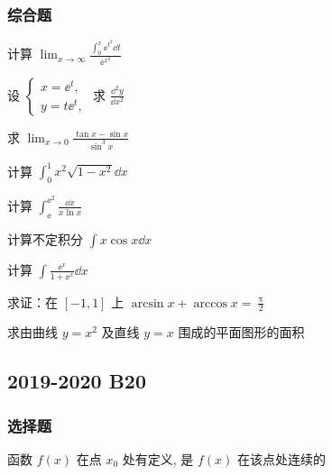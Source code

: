 \subsubsection{综合题}
\begin{ti}
	计算 $\lim_{x \to \infty} \frac{\int_{0}^{x} \ee^{t^{2}} \dd{t}}{\ee^{x^{2}}}$
\end{ti}

\begin{ti}
	设 $\begin{cases}
		x = \ee^{t},\\
		y = t \ee^{t},
	\end{cases}$ 求 $\frac{\dd^{2}y}{\dd{x^{2}}}$
\end{ti}

\begin{ti}
	求 $\lim_{x \to 0} \frac{\tan x - \sin x}{\sin^{3}x}$
\end{ti}

\begin{ti}
	计算 $\int_{0}^{1} x^{2} \sqrt{1 - x^{2}} \dd{x}$
\end{ti}

\begin{ti}
	计算 $\int_{\ee}^{\ee^{2}} \frac{\dd{x}}{x \ln x}$
\end{ti}

\begin{ti}
	计算不定积分 $\int x \cos x \dd{x}$
\end{ti}

\begin{ti}
	计算 $\int \frac{\ee^{x}}{1 + \ee^{x}} \dd{x}$
\end{ti}

\begin{ti}
	求证：在 $[-1,1]$ 上 $\arcsin x + \arccos x = \frac{\uppi}{2}$
\end{ti}

\begin{ti}
	求由曲线 $y = x^{2}$ 及直线 $y = x$ 围成的平面图形的面积
\end{ti}

\subsection{2019-2020 B20}
\subsubsection{选择题}
\begin{ti}[3 分]
	函数 $f(x)$ 在点 $x_{0}$ 处有定义, 是 $f(x)$ 在该点处连续的 \kuo
\end{ti}

